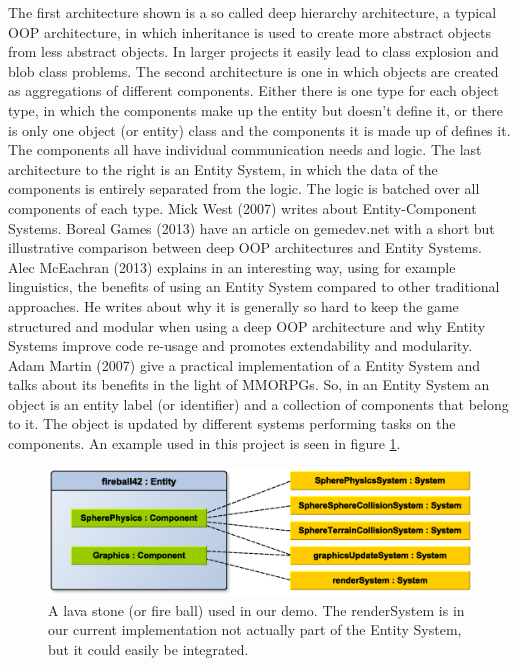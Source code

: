 The first architecture shown is a so called deep hierarchy architecture, a typical OOP architecture, in which inheritance is used to create more abstract objects from less abstract objects. In larger projects it easily lead to class explosion and blob class problems. The second architecture is one in which objects are created as aggregations of different components. Either there is one type for each object type, in which the components make up the entity but doesn't define it, or there is only one object (or entity) class and the components it is made up of defines it. The components all have individual communication needs and logic. The last architecture to the right is an Entity System, in which the data of the components is entirely separated from the logic. The logic is batched over all components of each type. Mick West (2007) writes about Entity-Component Systems. Boreal Games (2013) have an article on gemedev.net with a short but illustrative comparison between deep OOP architectures and Entity Systems. Alec McEachran (2013) explains in an interesting way, using for example linguistics, the benefits of using an Entity System compared to other traditional approaches. He writes about why it is generally so hard to keep the game structured and modular when using a deep OOP architecture and why Entity Systems improve code re-usage and promotes extendability and modularity. Adam Martin (2007) give a practical implementation of a Entity System and talks about its benefits in the light of MMORPGs. 	
\newpage
So, in an Entity System an object is an entity label (or identifier) and a collection of components that belong to it. The object is updated by different systems performing tasks on the components. An example used in this project is seen in figure \ref{fig:EntityComponentSystemExample}.
\begin{figure}[H]
  \centering
  \includegraphics[width=0.9\linewidth]{images/EntityComponentSystemExample.eps}
  \caption{A lava stone (or fire ball) used in our demo. The renderSystem is in our current implementation not actually part of the Entity System, but it could easily be integrated. }
  \label{fig:EntityComponentSystemExample}
\end{figure}
